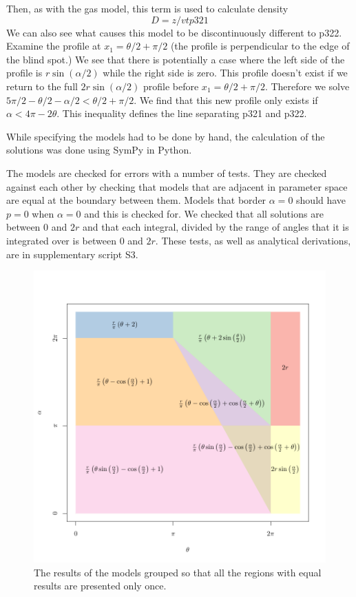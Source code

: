 \documentclass[a4paper,10pt,reqno,oneside]{amsart}
\begin{document}
Then, as with the gas model, this term is used to calculate density
\begin{equation}
D = z/vtp321
\end{equation}
We can also see what causes this model to be discontinuously different to p322. Examine the profile at $x_1 = 	\theta/2 + \pi/2$ (the profile is perpendicular to the edge of the blind spot.) We see that there is potentially a case where the left side of the profile is $r\sin( \alpha/2)$ while the right side is zero. This profile doesn't exist if we return to the full $2r\sin( \alpha/2)$ profile before $x_1  = \theta/2 + \pi/2$. Therefore we solve $5\pi/2 - \theta/2 - \alpha/2 <  \theta/2 + \pi/2$. We find that this new profile only exists if $ \alpha < 4\pi - 2 \theta$. This inequality defines the line separating p321 and p322.

While specifying the models had to be done by hand, the calculation of the solutions was done using SymPy \citep{sympy} in Python. 

The models are checked for errors with a number of tests. They are checked against each other by checking that models that are adjacent in parameter space are equal at the boundary between them. Models that border $ \alpha = 0$ should have $p = 0$ when $ \alpha = 0$ and this is checked for. We checked that all solutions are between 0 and $2r$ and that each integral, divided by the range of angles that it is integrated over is between 0 and $2r$. These tests, as well as analytical derivations, are in supplementary script S3.


\begin{figure}
\centering
\includegraphics[width=1\textwidth]{imgs/equalModelResults.pdf}
\caption{The results of the models grouped so that all the regions with equal results are presented only once.}
\label{f:equalModelResults}
\end{figure}
\end{document}
